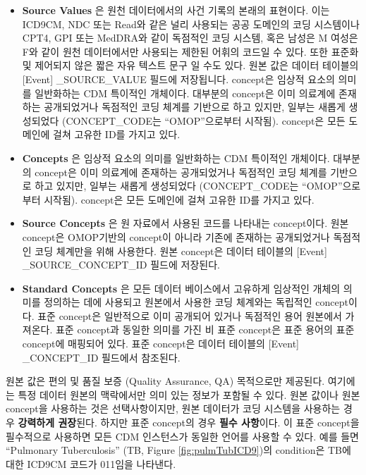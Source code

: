 \documentclass[11pt]{book}
\providecommand{\tightlist}{%
  \setlength{\itemsep}{0pt}\setlength{\parskip}{0pt}}
\theoremstyle{definition}
\theoremstyle{definition}
\theoremstyle{definition}
\theoremstyle{remark}
\begin{document}
\begin{itemize}
\tightlist
\item
  \textbf{Source Values} 은 원천 데이터에서의 사건 기록의 본래의
  표현이다. 이는 ICD9CM, NDC 또는 Read와 같은 널리 사용되는 공공
  도메인의 코딩 시스템이나 CPT4, GPI 또는 MedDRA와 같이 독점적인 코딩
  시스템, 혹은 남성은 M 여성은 F와 같이 원천 데이터에서만 사용되는
  제한된 어휘의 코드일 수 있다. 또한 표준화 및 제어되지 않은 짧은 자유
  텍스트 문구 일 수도 있다. 원본 값은 데이터 테이블의 {[}Event{]}
  \_SOURCE\_VALUE 필드에 저장됩니다. concept은 임상적 요소의 의미를
  일반화하는 CDM 특이적인 개체이다. 대부분의 concept은 이미 의료계에
  존재하는 공개되었거나 독점적인 코딩 체계를 기반으로 하고 있지만,
  일부는 새롭게 생성되었다 (CONCEPT\_CODE는 ``OMOP''으로부터 시작됨).
  concept은 모든 도메인에 걸쳐 고유한 ID를 가지고 있다.
\item
  \textbf{Concepts} 은 임상적 요소의 의미를 일반화하는 CDM 특이적인
  개체이다. 대부분의 concept은 이미 의료계에 존재하는 공개되었거나
  독점적인 코딩 체계를 기반으로 하고 있지만, 일부는 새롭게 생성되었다
  (CONCEPT\_CODE는 ``OMOP''으로부터 시작됨). concept은 모든 도메인에
  걸쳐 고유한 ID를 가지고 있다.
\item
  \textbf{Source Concepts} 은 원 자료에서 사용된 코드를 나타내는
  concept이다. 원본 concept은 OMOP기반의 concept이 아니라 기존에
  존재하는 공개되었거나 독점적인 코딩 체계만을 위해 사용한다. 원본
  concept은 데이터 테이블의 {[}Event{]} \_SOURCE\_CONCEPT\_ID 필드에
  저장된다.
\item
  \textbf{Standard Concepts} 은 모든 데이터 베이스에서 고유하게 임상적인
  개체의 의미를 정의하는 데에 사용되고 원본에서 사용한 코딩 체계와는
  독립적인 concept이다. 표준 concept은 일반적으로 이미 공개되어 있거나
  독점적인 용어 원본에서 가져온다. 표준 concept과 동일한 의미를 가진 비
  표준 concept은 표준 용어의 표준 concept에 매핑되어 있다. 표준
  concept은 데이터 테이블의 {[}Event{]} \_CONCEPT\_ID 필드에서 참조된다.
\end{itemize}

원본 값은 편의 및 품질 보증 (Quality Assurance, QA) 목적으로만 제공된다.
여기에는 특정 데이터 원본의 맥락에서만 의미 있는 정보가 포함될 수 있다.
원본 값이나 원본 concept을 사용하는 것은 선택사항이지만, 원본 데이터가
코딩 시스템을 사용하는 경우 \textbf{강력하게 권장}된다. 하지만 표준
concept의 경우 \textbf{필수 사항}이다. 이 표준 concept을 필수적으로
사용하면 모든 CDM 인스턴스가 동일한 언어를 사용할 수 있다. 예를 들면
``Pulmonary Tuberculosis'' (TB, Figure \ref{fig:pulmTubICD9})의
condition은 TB에 대한 ICD9CM 코드가 011임을 나타낸다.
\end{document}
